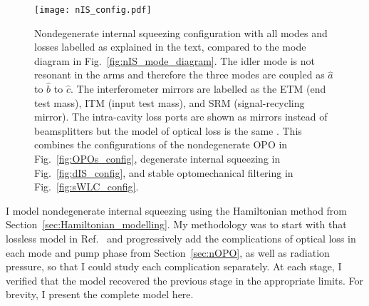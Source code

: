\begin{figure}
	\centering
	\texttt{[image: nIS\_config.pdf]}
	\caption{  Nondegenerate internal squeezing configuration with all modes and losses labelled as explained in the text, compared to the mode diagram in Fig.~\ref{fig:nIS_mode_diagram}. The idler mode is not resonant in the arms and therefore the three modes are coupled as $\hat a$ to $\hat b$ to $\hat c$. The interferometer mirrors are labelled as the ETM (end test mass), ITM (input test mass), and SRM (signal-recycling mirror). The intra-cavity loss ports are shown as mirrors instead of beamsplitters but the model of optical loss is the same . This combines the configurations of the nondegenerate OPO in Fig.~\ref{fig:OPOs_config}, degenerate internal squeezing in Fig.~\ref{fig:dIS_config}, and stable optomechanical filtering in Fig.~\ref{fig:sWLC_config}.}
	\label{fig:nIS_config}
\end{figure}

I model nondegenerate internal squeezing using the Hamiltonian method from Section~\ref{sec:Hamiltonian_modelling}. %
My methodology was to start with that lossless model in Ref.~\cite{liBroadbandSensitivityImprovement2020} and progressively add the complications of optical loss in each mode and pump phase from Section~\ref{sec:nOPO}, as well as radiation pressure, so that I could study each complication separately. At each stage, I verified that the model recovered the previous stage in the appropriate limits.  For brevity, I present the complete model here.

